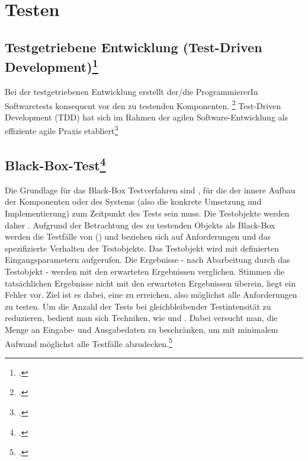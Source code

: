 \documentclass{bschlangaul-theorie}
\begin{document}
\let\b=\liBedingung
\let\c=\liKontrollCode
\let\f=\liBedingungFalsch
\let\k=\liKontrollTextzeileKnoten
\let\p=\liKontrollKnotenPfad
\let\w=\liBedingungWahr


\chapter{Testen}

\begin{liQuellen}
\item \cite[Kapitel 4 „Software-Text“; Seite 157-246]{hoffmann:software}
\end{liQuellen}

\section{Testgetriebene Entwicklung (Test-Driven
Development)\footcite[Kaptiel 5.7 Seite 150-145]{schatten}}

Bei der testgetriebenen Entwicklung erstellt der/die ProgrammiererIn
Softwaretests konsequent vor den zu testenden Komponenten.
\footcite{wiki:testgetriebene-entwicklung}
Test-Driven Development (TDD) hat sich im Rahmen der agilen
Software-Entwicklung als effiziente agile Praxis etabliert\footcite[Seite
151]{schatten}

%

\section{Black-Box-Test\footcite[Seite 32]{sosy:fs:5}}

Die Grundlage für das Black-Box Testverfahren sind , für die der innere Aufbau der Komponenten oder des
Systems (also die konkrete Umsetzung und Implementierung) zum Zeitpunkt
des Tests  sein muss. Die Testobjekte werden daher
. Aufgrund der
Betrachtung des zu testenden Objekts als Black-Box werden die Testfälle
von  () und beziehen sich auf
Anforderungen und das spezifizierte Verhalten der Testobjekte. Das
Testobjekt wird mit definierten Eingangsparametern aufgerufen. Die
Ergebnisse - nach Abarbeitung durch das Testobjekt - werden mit den
erwarteten Ergebnissen verglichen. Stimmen die tatsächlichen Ergebnisse
nicht mit den erwarteten Ergebnissen überein, liegt ein Fehler vor. Ziel
ist es dabei, eine  zu
erreichen, also möglichst alle Anforderungen zu testen. Um die Anzahl
der Tests bei gleichbleibender Testintensität zu reduzieren, bedient man
sich Techniken, wie  und
. Dabei versucht man, die Menge an Eingabe- und
Ausgabedaten zu beschränken, um mit minimalem Aufwand möglichst alle
Testfälle abzudecken.\footcite[Seite 140-141]{schatten}
\end{document}
